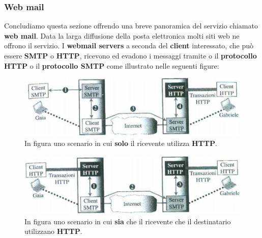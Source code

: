\documentclass[11pt,a4paper,oneside]{book}
\theoremstyle{definition}
\begin{document}
\subsubsection{Web mail}
Concludiamo questa sezione offrendo una breve panoramica del servizio chiamato \textbf{web mail}. Data la larga diffusione della posta elettronica molti siti web ne offrono il servizio. I \textbf{webmail servers} a seconda del \textbf{client} interessato, che può essere \textbf{SMTP} o \textbf{HTTP}, ricevono ed evadono i messaggi tramite o il \textbf{protocollo HTTP} o il \textbf{protocollo SMTP} come illustrato nelle seguenti figure:
\begin{figure}[!h]
	\includegraphics[scale=0.6]{Immagini/Web_mail.png}
	\centering
	\caption{In figura uno scenario in cui \textbf{solo} il ricevente utilizza \textbf{HTTP}.}
\end{figure}
\begin{figure}[!h]
	\includegraphics[scale=0.6]{Immagini/Web_mail1.png}
	\centering
	\caption{In figura uno scenario in cui \textbf{sia} che il ricevente che il destinatario utilizzano \textbf{HTTP}.}
\end{figure}
\end{document}
